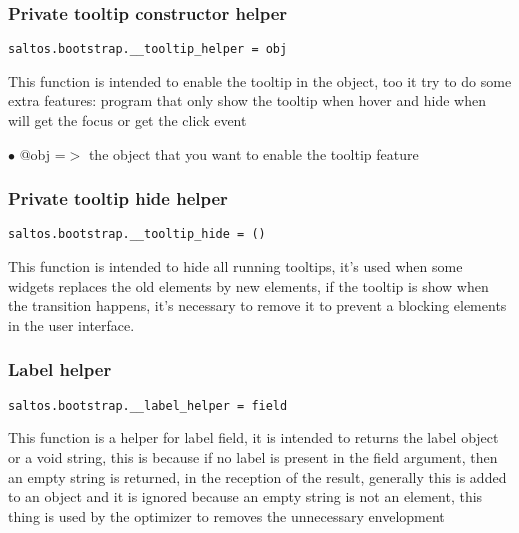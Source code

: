 \documentclass[a4paper]{article}
\begin{document}
\hypertarget{toc653}{}
\subsubsection{Private tooltip constructor helper}

\begin{lstlisting}
saltos.bootstrap.__tooltip_helper = obj
\end{lstlisting}

This function is intended to enable the tooltip in the object, too it try to do some
extra features: program that only show the tooltip when hover and hide when will get
the focus or get the click event

\begin{compactitem}
\item[\color{myblue}$\bullet$] @obj =$>$ the object that you want to enable the tooltip feature
\end{compactitem}

\hypertarget{toc654}{}
\subsubsection{Private tooltip hide helper}

\begin{lstlisting}
saltos.bootstrap.__tooltip_hide = ()
\end{lstlisting}

This function is intended to hide all running tooltips, it's used when some widgets
replaces the old elements by new elements, if the tooltip is show when the transition
happens, it's necessary to remove it to prevent a blocking elements in the user
interface.

\hypertarget{toc655}{}
\subsubsection{Label helper}

\begin{lstlisting}
saltos.bootstrap.__label_helper = field
\end{lstlisting}

This function is a helper for label field, it is intended to returns the label object
or a void string, this is because if no label is present in the field argument, then
an empty string is returned, in the reception of the result, generally this is added
to an object and it is ignored because an empty string is not an element, this thing
is used by the optimizer to removes the unnecessary envelopment
\end{document}
